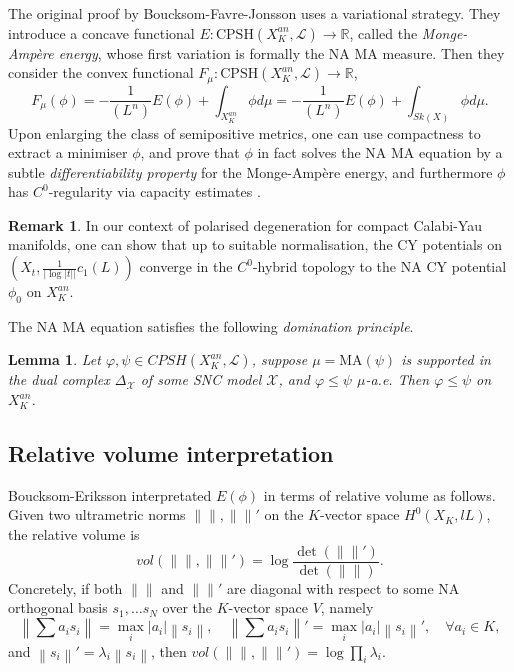 \documentclass[a4paper]{article}
\newtheorem{lem}[thm]{Lemma}
\theoremstyle{definition}
\newtheorem{rmk}[thm]{Remark}
\newcommand{\R}{\mathbb{R}}
\newcommand{\norm}[1]{\left\lVert#1\right\rVert}
\begin{document}
	The original proof by Boucksom-Favre-Jonsson uses a variational strategy. They introduce a concave functional $E: \text{CPSH}(X_K^{an}, \mathcal{L})\to \R$, called the \emph{Monge-Amp\`ere energy}, whose first variation is formally the NA MA measure. Then they consider the convex functional $F_{\mu}: \text{CPSH}(X_K^{an}, \mathcal{L})\to \R$,
	\begin{equation}\label{eqn:Fmu01}
		F_{\mu}(\phi)= -  \frac{1}{(L^n)} E(\phi)+ \int_{X_K^{an}} \phi d\mu =- \frac{1}{(L^n)}E(\phi)+ \int_{Sk(X)} \phi d\mu .
	\end{equation}
Upon enlarging the class of semipositive metrics, one can use compactness to extract a minimiser $\phi$, and prove that $\phi$ in fact solves the NA MA equation by a subtle \emph{differentiability property} for the Monge-Amp\`ere energy, and furthermore $\phi$ has $C^0$-regularity via capacity estimates \cite{Boucksom, Boucksomsurvey}. 
	
	
	\begin{rmk}
	In our context of polarised degeneration for compact Calabi-Yau manifolds, one can show that up to suitable normalisation, the CY potentials on $(X_t, \frac{1}{|\log |t||} c_1(L))$ converge in the $C^0$-hybrid topology to the NA CY potential $\phi_0$ on $X_K^{an}$. 
	\end{rmk}
	
The NA MA equation satisfies the following \emph{domination principle}. 


\begin{lem}\label{lem:dominationproperty}
\cite[Lemma 8.4]{Boucksom} Let $\varphi, \psi \in CPSH(X_K^{an}, \mathcal{L})$, suppose $\mu= \text{MA}(\psi)$ is supported in the dual complex $\Delta_{\mathcal{X}}$ of some SNC model $\mathcal{X}$, and $\varphi\leq \psi$ $\mu$-a.e. Then $\varphi\leq \psi$ on $X_K^{an}$.
\end{lem}
	
	

	
	
	
	
	
	
	\subsection{Relative volume interpretation}\label{sect:relativevolume}
	
		
 
	
	Boucksom-Eriksson \cite{Boucksomnew1}  interpretated $E(\phi)$ in terms of relative volume as follows. Given two ultrametric norms $\norm{}, \norm{}'$ on the $K$-vector space $ H^0(X_K, lL)  $, the relative volume is
	\[
	vol(  \norm{}, \norm{}'  )=  \log \frac{  \det(\norm{}')  } {   \det(\norm{})   }.
	\]
	Concretely, if both $\norm{}$ and $\norm{}'$ are diagonal with respect to some NA orthogonal basis $s_1,\ldots s_N$ over the $K$-vector space $V$, namely
	\[
	\norm{ \sum a_i s_i}= \max_i |a_i| \norm{s_i}, \quad \norm{ \sum a_i s_i}'= \max_i |a_i| \norm{s_i}',\quad \forall a_i\in K,
	\]
	and $\norm{s_i}'= \lambda_i \norm{s_i}$, then $vol( \norm{}, \norm{}'    )= \log  \prod_i \lambda_i$.  
	
\end{document}
